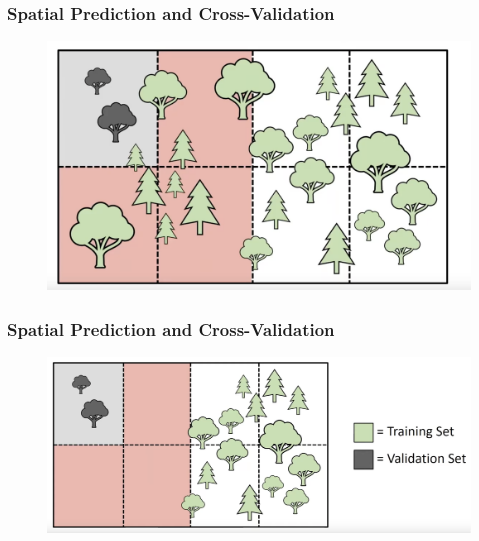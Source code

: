 \documentclass[
  shownotes,
  xcolor={svgnames},
  hyperref={colorlinks,citecolor=DarkBlue,linkcolor=andesred,urlcolor=DarkBlue}
  , aspectratio=169]{beamer}
\begin{document}
\begin{frame}[fragile]
\frametitle{Spatial Prediction and Cross-Validation}

  \begin{minipage}[c]{0.6\linewidth}
        
      \begin{figure}[H] \centering
        \captionsetup{justification=centering}
        \includegraphics[scale=0.3]{figures/spatial_cross/fig14.png}
      \end{figure}
           
    \end{minipage}
    \hfill
    \begin{minipage}[t]{0.35\linewidth}%
    

    \end{minipage}

\end{frame}
\begin{frame}[fragile]
\frametitle{Spatial Prediction and Cross-Validation}

  \begin{minipage}[c]{0.6\linewidth}
        
      \begin{figure}[H] \centering
        \captionsetup{justification=centering}
        \includegraphics[scale=0.3]{figures/spatial_cross/fig15.png}
      \end{figure}
           
    \end{minipage}
    \hfill
    \begin{minipage}[t]{0.35\linewidth}%
    

    \end{minipage}

\end{frame}
\end{document}
